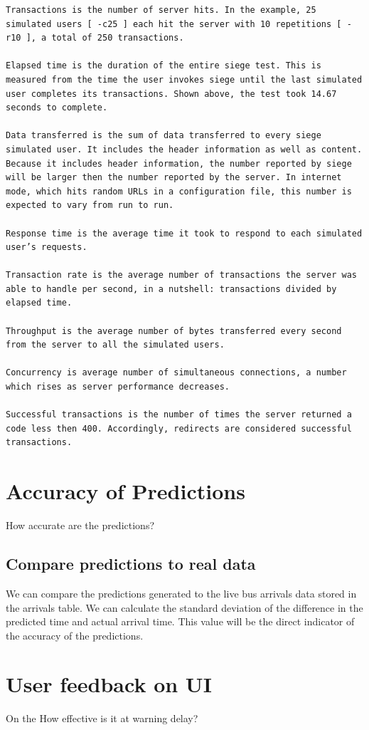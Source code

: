 
\begin{verbatim}
Transactions is the number of server hits. In the example, 25 simulated users [ -c25 ] each hit the server with 10 repetitions [ -r10 ], a total of 250 transactions.

Elapsed time is the duration of the entire siege test. This is measured from the time the user invokes siege until the last simulated user completes its transactions. Shown above, the test took 14.67 seconds to complete.

Data transferred is the sum of data transferred to every siege simulated user. It includes the header information as well as content. Because it includes header information, the number reported by siege will be larger then the number reported by the server. In internet mode, which hits random URLs in a configuration file, this number is expected to vary from run to run.

Response time is the average time it took to respond to each simulated user’s requests.

Transaction rate is the average number of transactions the server was able to handle per second, in a nutshell: transactions divided by elapsed time.

Throughput is the average number of bytes transferred every second from the server to all the simulated users.

Concurrency is average number of simultaneous connections, a number which rises as server performance decreases.

Successful transactions is the number of times the server returned a code less then 400. Accordingly, redirects are considered successful transactions.
\end{verbatim}

\section{Accuracy of Predictions}
How accurate are the predictions?
\subsection{Compare predictions to real data}
We can compare the predictions generated to the live bus arrivals data stored in the arrivals table. We can calculate the standard deviation of the difference in the predicted time and actual arrival time. This value will be the direct indicator of the accuracy of the predictions.


\section{User feedback on UI}
\par On the
How effective is it at warning delay?

